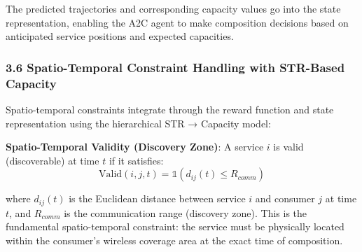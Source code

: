 \begin{Shaded}
	\begin{Highlighting}[]
		\OperatorTok{=}\NormalTok{ []}
		\OperatorTok{=}

		 
		\OperatorTok{=}\OperatorTok{+}\OperatorTok{*}\OperatorTok{+}\NormalTok{, }\NormalTok{)}

		\OperatorTok{=}
		\OperatorTok{=}

	\end{Highlighting}
\end{Shaded}

The predicted trajectories and corresponding capacity values go into the
state representation, enabling the A2C agent to make composition
decisions based on anticipated service positions and expected
capacities.

\hypertarget{spatio-temporal-constraint-handling-with-str-based-capacity}{%
	\subsubsection{3.6 Spatio-Temporal Constraint Handling with STR-Based
		Capacity}\label{spatio-temporal-constraint-handling-with-str-based-capacity}}

Spatio-temporal constraints integrate through the reward function and
state representation using the hierarchical STR → Capacity model:

\textbf{Spatio-Temporal Validity (Discovery Zone)}: A service \(i\) is
valid (discoverable) at time \(t\) if it satisfies:
\[\text{Valid}(i, j, t) = \mathbb{1}(d_{ij}(t) \leq R_{comm})\]

where \(d_{ij}(t)\) is the Euclidean distance between service \(i\) and
consumer \(j\) at time \(t\), and \(R_{comm}\) is the communication
range (discovery zone). This is the fundamental spatio-temporal
constraint: the service must be physically located within the consumer's
wireless coverage area at the exact time of composition.

